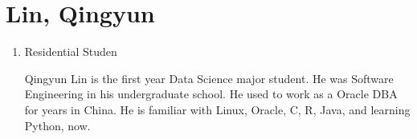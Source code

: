 \documentclass[12pt]{article}
\begin{document}
	
	\section{Lin, Qingyun}
	\begin{enumerate}
		\item 	Residential Studen
		
	Qingyun Lin is the first year Data Science major student. He was Software Engineering in his undergraduate school. 
He used to work as a Oracle DBA for years in China. 
He is familiar with Linux, Oracle, C, R, Java, and learning Python, now.
\end{enumerate}
	
\end{document}
